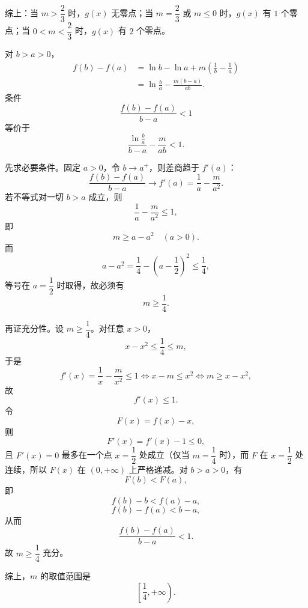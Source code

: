 \begin{answer}
综上：当 $m>\dfrac23$ 时，$g(x)$ 无零点；当 $m=\dfrac23$ 或 $m\leqslant0$ 时，$g(x)$ 有 $1$ 个零点；当 $0<m<\dfrac23$ 时，$g(x)$ 有 $2$ 个零点。


对 $b>a>0$，
\nopagebreak[4]
\[\begin{aligned}
f(b)-f(a)
&=\ln b-\ln a+m\left(\frac1b-\frac1a\right)\\
&=\ln\frac ba-\frac{m(b-a)}{ab}.
\end{aligned}\]
条件
\nopagebreak[4]
\[\frac{f(b)-f(a)}{b-a}<1\]
等价于
\nopagebreak[4]
\[\frac{\ln\frac ba}{b-a}-\frac{m}{ab}<1. \tag{1}\]

先求必要条件。固定 $a>0$，令 $b\to a^+$，则差商趋于 $f'(a)$：
\nopagebreak[4]
\[\frac{f(b)-f(a)}{b-a}\longrightarrow f'(a)=\frac1a-\frac{m}{a^2}.\]
若不等式对一切 $b>a$ 成立，则
\nopagebreak[4]
\[\frac1a-\frac{m}{a^2}\leqslant1,\]
即
\nopagebreak[4]
\[m\geqslant a-a^2\quad(a>0).\]
而
\nopagebreak[4]
\[a-a^2=\frac14-\left(a-\frac12\right)^2\leqslant\frac14,\]
等号在 $a=\dfrac12$ 时取得，故必须有
\nopagebreak[4]
\[m\geqslant\frac14. \tag{2}\]

再证充分性。设 $m\geqslant\dfrac14$。对任意 $x>0$，
\nopagebreak[4]
\[x-x^2\leqslant\frac14\leqslant m,\]
于是
\nopagebreak[4]
\[f'(x)=\frac1x-\frac{m}{x^2}\leqslant1
\iff x-m\leqslant x^2
\iff m\geqslant x-x^2,\]
故
\nopagebreak[4]
\[f'(x)\leqslant1.\]
令
\nopagebreak[4]
\[F(x)=f(x)-x,\]
则
\nopagebreak[4]
\[F'(x)=f'(x)-1\leqslant0,\]
且 $F'(x)=0$ 最多在一个点 $x=\dfrac12$ 处成立（仅当 $m=\dfrac14$ 时），而 $F$ 在 $x=\dfrac12$ 处连续，所以 $F(x)$ 在 $(0,+\infty)$ 上严格递减。对 $b>a>0$，有
\nopagebreak[4]
\[F(b)<F(a),\]
即
\nopagebreak[4]
\[f(b)-b<f(a)-a,\]
\nopagebreak[4]
\[f(b)-f(a)<b-a,\]
从而
\nopagebreak[4]
\[\frac{f(b)-f(a)}{b-a}<1.\]
故 $m\geqslant\dfrac14$ 充分。

综上，$m$ 的取值范围是
\nopagebreak[4]
\[\left[\frac14,+\infty\right).\]



\gkanswer{答案（3）：$\left[\dfrac14,+\infty\right)$。由差商极限得 $f'(x)\leqslant1$ 对一切 $x>0$ 成立，即 $m\geqslant x-x^2$，故 $m\geqslant\dfrac14$。}

\end{answer}